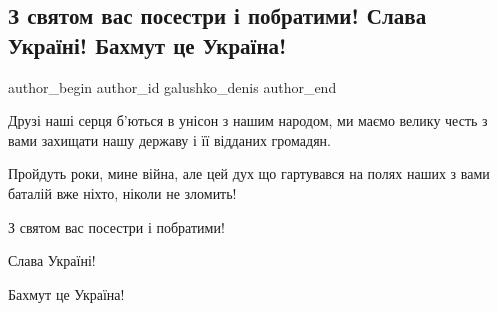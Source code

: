  
 
 
 
 

\subsection{З святом вас посестри і побратими! Слава Україні! Бахмут це Україна!}
\label{sec:06_12_2022.fb.galushko_denis.1.z_svyatom_vas_posest}

\ifcmt
 author_begin
   author_id galushko_denis
 author_end
\fi

Друзі наші серця б'ються в унісон з нашим народом, ми маємо велику честь з вами
захищати нашу державу і її відданих громадян.

Пройдуть роки, мине війна, але цей дух що гартувався на полях наших з вами
баталій вже ніхто, ніколи не зломить!

З святом вас посестри і побратими!

Слава Україні!

Бахмут це Україна!
